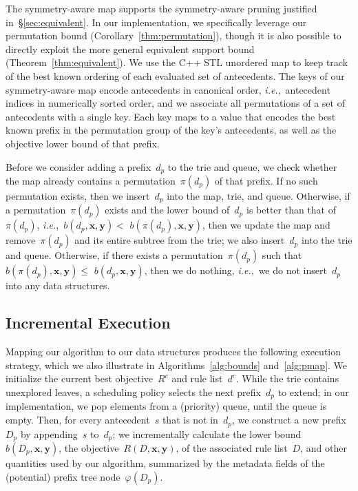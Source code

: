 \documentclass[twoside,11pt]{article}
\def\ie{{\it i.e.},~}
\newcommand{\x}{\mathbf{x}}
\newcommand{\y}{\mathbf{y}}
\def\Prefix{d_p}
\def\RLB{{D}}
\def\PrefixB{D_p}
\def\Obj{R}
\def\CurrentObj{{R^c}}
\def\CurrentRL{d^c}
\begin{document}
The symmetry-aware map supports the symmetry-aware pruning justified in~\S\ref{sec:equivalent}.
%
In our implementation, we specifically leverage our permutation bound
(Corollary~\ref{thm:permutation}), though it is also possible to directly
exploit the more general equivalent support bound (Theorem~\ref{thm:equivalent}).
%
We use the C++ STL unordered map to keep track of the best known ordering
of each evaluated set of antecedents.
%
The keys of our symmetry-aware map encode antecedents in canonical order,
\ie antecedent indices in numerically sorted order,
and we associate all permutations of a set of antecedents with a single key.
%
Each key maps to a value that encodes the best known prefix in the permutation
group of the key's antecedents, as well as the objective lower bound of that prefix.

Before we consider adding a prefix~$\Prefix$ to the trie and queue, we check
whether the map already contains a permutation~$\pi(\Prefix)$ of that prefix.
%
If no such permutation exists, then we insert~$\Prefix$ into the map, trie, and queue.
%
Otherwise, if a permutation~$\pi(\Prefix)$ exists and the lower bound of~$\Prefix$ is better
than that of~$\pi(\Prefix)$, \ie ${b(\Prefix, \x, \y) <}$ ${b(\pi(\Prefix), \x, \y)}$,
then we update the map and remove~$\pi(\Prefix)$ and its entire subtree from the trie;
we also insert~$\Prefix$ into the trie and queue.
%
Otherwise, if there exists a permutation~$\pi(\Prefix)$ such that
${b(\pi(\Prefix), \x, \y) \le}$ ${b(\Prefix, \x, \y)}$,
then we do nothing, \ie we do not insert~$\Prefix$ into any data structures.

\subsection{Incremental Execution}
\label{sec:execution}

Mapping our algorithm to our data structures produces the following execution strategy,
which we also illustrate in Algorithms~\ref{alg:bounds} and~\ref{alg:pmap}.
%
We initialize the current best objective~$\CurrentObj$ and rule list~$\CurrentRL$.
%
While the trie contains unexplored leaves, a scheduling policy selects the next prefix~$\Prefix$
to extend; in our implementation, we pop elements from a (priority) queue, until the queue is empty.
%
Then, for every antecedent~$s$ that is not in~$\Prefix$,
we construct a new prefix~$\PrefixB$ by appending~$s$ to~$\Prefix$;
we incrementally calculate the lower bound~$b(\PrefixB, \x, \y)$,
the objective~$\Obj(\RLB, \x, \y)$, of the associated rule list~$\RLB$,
and other quantities used by our algorithm, summarized by the metadata fields of
the (potential) prefix tree node~$\varphi(\PrefixB)$.
\end{document}
